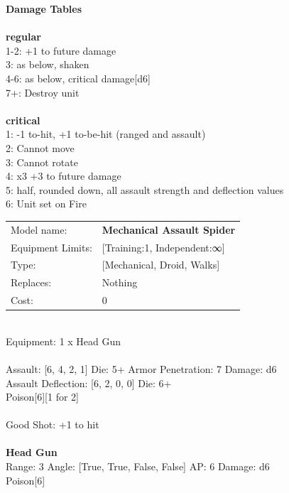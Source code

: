 {{\bf Damage Tables} \\
\ \\ {\bf regular } \\
1-2: +1 to future damage \\
3: as below, shaken \\
4-6: as below, critical damage[d6] \\
7+: Destroy unit \\
\ \\ {\bf critical } \\
1: -1 to-hit, +1 to-be-hit (ranged and assault) \\
2: Cannot move \\
3: Cannot rotate \\
4: x3 +3 to future damage \\
5: half, rounded down, all assault strength and deflection values \\
6: Unit set on Fire \\


\noindent
\begin{tabular}{ll}
Model name: &{\bf Mechanical Assault Spider } \\
Equipment Limits: &[Training:1, Independent:∞] \\
Type: &[Mechanical, Droid, Walks] \\
Replaces: &Nothing \\
Cost: & 0\\
\end{tabular}
\ \\
Equipment: 1 x Head Gun \\
\ \\
Assault: [6, 4, 2, 1] Die: 5+ Armor Penetration: 7 Damage: d6 \\
Assault Deflection: [6, 2, 0, 0] Die: 6+\\
\indent Poison[6][1 for 2]\\ 
 
\ \\
Good Shot: +1 to hit\\ 

\ \\
{\bf Head Gun } \\



Range: 3  Angle: [True, True, False, False] AP: 6 Damage: d6 \\
Poison[6]\\ 




}
